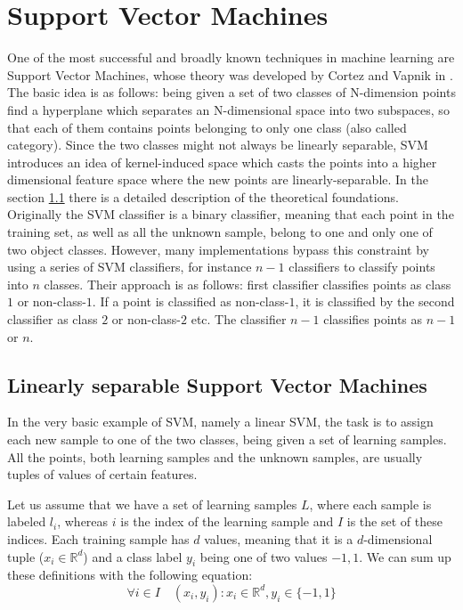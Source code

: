 
\section{Support Vector Machines}\label{sec:svm}
One of the most successful and broadly known techniques in machine learning are Support Vector Machines, whose theory was developed by Cortez and Vapnik in \cite{C.Cortes1995}. The basic idea is as follows: being given a set of two classes of N-dimension points find a hyperplane which separates an N-dimensional space into two subspaces, so that each of them contains points belonging to only one class (also called category). Since the two classes might not always be linearly separable, SVM introduces an idea of kernel-induced space which casts the points into a higher dimensional feature space where the new points are linearly-separable. In the section \ref{subsec:linear_svm} there is a detailed description of the theoretical foundations. Originally the SVM classifier is a binary classifier, meaning that each point in the training set, as well as all the unknown sample, belong to one and only one of two object classes. However, many implementations bypass this constraint by using a series of SVM classifiers, for instance $n-1$ classifiers to classify points into $n$ classes. Their approach is as follows: first classifier classifies points as class $1$ or non-class-$1$. If a point is classified as non-class-$1$, it is classified by the second classifier as class $2$ or non-class-$2$ etc. The classifier $n-1$ classifies points as $n-1$ or $n$.

\subsection{Linearly separable Support Vector Machines}
\label{subsec:linear_svm}
In the very basic example of SVM, namely a linear SVM, the task is to assign each new sample to one of the two classes, being given a set of learning samples. All the points, both learning samples and the unknown samples, are usually tuples of values of certain features.

Let us assume that we have a set of learning samples $L$, where each sample is labeled $l_i$, whereas $i$ is the index of the learning sample and $I$ is the set of these indices. Each training sample has $d$ values, meaning that it is a $d$-dimensional tuple ($x_i \in \mathbb{R}^d$) and a class label $y_i$ being one of two values ${-1, 1}$. We can sum up these definitions with the following equation:
\begin{equation}
\forall{i \in I} \quad \left(x_i, y_i\right) : x_i \in \mathbb{R}^d, y_i \in \{-1, 1\}
\end{equation} 

